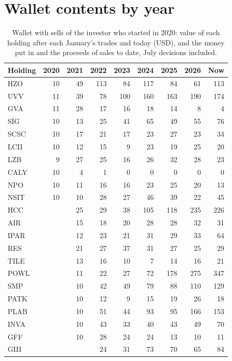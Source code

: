 \documentclass[11pt,a4paper]{article}
\begin{document}
\section{Wallet contents by year}
\label{app:contents}
{\small
\begin{longtable}{l r r r r r r r r }
\caption{Wallet with sells of the investor who started in 2020: value of each holding after each January's trades and today (USD), and the money put in and the proceeds of sales to date, July decisions included.}\label{tab:contents}\\
\hline
Holding & 2020 & 2021 & 2022 & 2023 & 2024 & 2025 & 2026 & Now \\
\hline
\endhead
HZO & 10 & 49 & 113 & 84 & 117 & 84 & 61 & 113 \\
UVV & 11 & 39 & 78 & 100 & 160 & 163 & 190 & 174 \\
GVA & 11 & 28 & 17 & 16 & 18 & 14 & 8 & 4 \\
SIG & 10 & 13 & 25 & 41 & 65 & 49 & 55 & 76 \\
SCSC & 10 & 17 & 21 & 17 & 23 & 27 & 23 & 34 \\
LCII & 10 & 12 & 15 & 9 & 23 & 19 & 25 & 20 \\
LZB & 9 & 27 & 25 & 16 & 26 & 32 & 28 & 23 \\
CALY & 10 & 4 & 1 & 0 & 0 & 0 & 0 & 0 \\
NPO & 10 & 11 & 16 & 16 & 23 & 25 & 20 & 13 \\
NSIT & 10 & 10 & 28 & 27 & 46 & 39 & 22 & 45 \\
HCC &  & 25 & 29 & 38 & 105 & 118 & 235 & 226 \\
AIR &  & 15 & 18 & 20 & 28 & 28 & 32 & 31 \\
IPAR &  & 12 & 23 & 21 & 31 & 29 & 33 & 64 \\
RES &  & 21 & 27 & 37 & 31 & 27 & 25 & 29 \\
TILE &  & 13 & 16 & 10 & 7 & 14 & 16 & 21 \\
POWL &  & 11 & 22 & 27 & 72 & 178 & 275 & 347 \\
SMP &  & 10 & 42 & 49 & 79 & 88 & 110 & 129 \\
PATK &  & 10 & 12 & 9 & 15 & 19 & 26 & 18 \\
PLAB &  & 10 & 51 & 44 & 93 & 95 & 166 & 153 \\
INVA &  & 10 & 43 & 33 & 40 & 43 & 49 & 70 \\
GFF &  & 10 & 28 & 24 & 24 & 13 & 10 & 11 \\
GIII &  &  & 24 & 31 & 73 & 70 & 65 & 84 \\

\end{longtable}}
\end{document}
